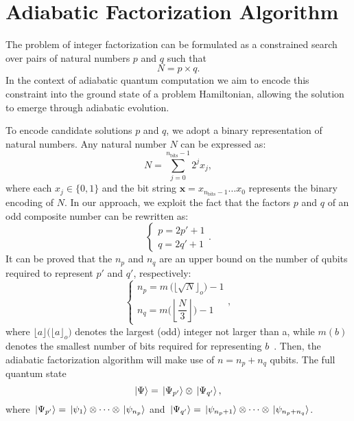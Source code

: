 \section{Adiabatic Factorization Algorithm}

The problem of integer factorization can be formulated as a
constrained search over pairs of natural numbers $p$ and $q$
such that
\begin{equation}
	N = p \times q.
	\label{eq:integer_factorization}
\end{equation}
In the context of adiabatic quantum computation we aim to
encode this constraint into the ground state of a problem Hamiltonian,
allowing the solution to emerge through adiabatic evolution.

To encode candidate solutions $p$ and $q$, we adopt a binary representation
of natural numbers. Any natural number $N$ can be expressed as:
\begin{equation}
	N = \sum_{j=0}^{n_\text{bits} - 1} 2^j x_j,
	\label{eq:binary_integer}
\end{equation}
where each $x_j \in \{0,1\}$ and the bit string $\mathbf{x} = x_{n_\text{bits}-1} \dots x_0$
represents the binary encoding of $N$. In our approach, we exploit the fact that the factors
$p$ and $q$ of an odd composite number can be rewritten as:
\begin{equation}
	\begin{cases}
		p = 2p' + 1 \\
		q = 2q' + 1
	\end{cases} .
	\label{eq:factors_simplification}
\end{equation}
It can be proved that the $n_p$ and $n_q$ are an upper bound on the number of qubits
required to represent $p'$ and $q'$, respectively:
\begin{equation}
	\begin{cases}
		n_p = m\,\big(\lfloor \sqrt{N} \rfloor_o\big) - 1 \\[2ex]
		n_q = m\bigg(\left\lfloor \dfrac{N}{3} \right\rfloor \bigg) - 1
	\end{cases} ,
	\label{eq:factors_num_bits}
\end{equation}
where $\lfloor a \rfloor \big(\lfloor a \rfloor_o\big)$ denotes the largest (odd)
integer not larger than a, while $m(b)$ denotes the smallest number of bits
required for representing $b$~\cite{peng_quantum_2008}. Then, the adiabatic factorization
algorithm will make use of $n = n_p + n_q$ qubits. The full quantum state 
\begin{equation}
	\ket{\Psi} = \ket*{\Psi_{p'}} \otimes \ket*{\Psi_{q'}},
	\label{eq:full_quantum_state}
\end{equation}
where $\ket*{\Psi_{p'}} = \ket*{\psi_{1}}\otimes \cdots \otimes \ket*{\psi_{n_p}}$
and $\ket*{\Psi_{q'}} = \ket*{\psi_{n_p+1}}\otimes \cdots \otimes \ket*{\psi_{n_p +n_q}}$.

